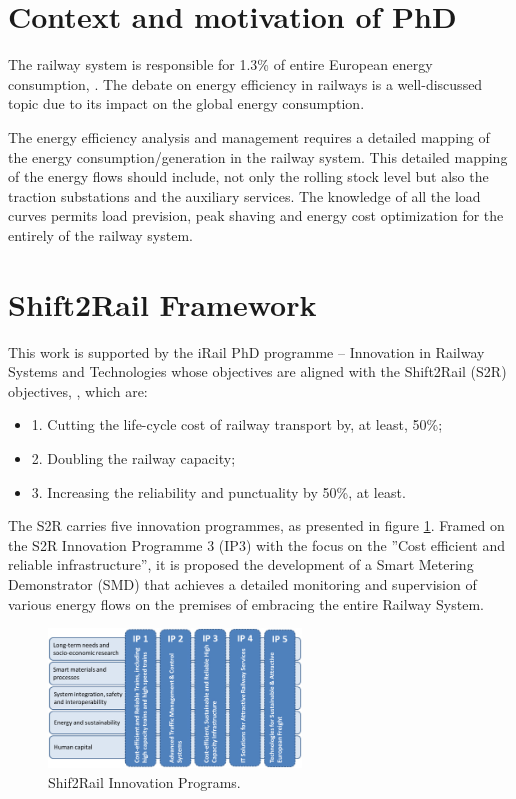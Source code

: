 
\section{Context and motivation of PhD}

The railway system is responsible for 1.3\% of entire European energy consumption, \cite{iea-uic2016}. 
The debate on energy efficiency in railways is a well-discussed topic due to its impact on the global energy consumption.

The energy efficiency analysis and management requires a detailed mapping of the energy consumption/generation in the railway system. 
This detailed mapping of the energy flows should include, not only the rolling stock level but also the traction substations and the auxiliary services.
The knowledge of all the load curves permits load prevision, peak shaving and energy cost optimization for the entirely of the railway system.


\section{Shift2Rail Framework}

This work is supported by the iRail PhD programme – Innovation in Railway Systems and Technologies whose objectives are aligned with the Shift2Rail (S2R) objectives, \cite{shift2rail2015}, which are: 

\begin{itemize}
	\setlength\itemsep{-0.5em}
	\item 1. Cutting the life-cycle cost of railway transport by, at least, 50\%;
	\item 2. Doubling the railway capacity;
	\item 3. Increasing the reliability and punctuality by 50\%, at least.
\end{itemize}


The S2R carries five innovation programmes, as presented in figure \ref{fig:ips}. Framed on the S2R Innovation Programme 3 (IP3) with the focus on the ”Cost efficient and reliable infrastructure”, it is proposed the development of a Smart Metering Demonstrator (SMD) that achieves a detailed monitoring and supervision of various energy flows on the premises of embracing the entire Railway System.

\begin{figure}[h!]
	\centering
	\includegraphics[width=0.60\textwidth,keepaspectratio]{figures/1.Intro/IPs}
	\caption{Shif2Rail Innovation Programs. }
	\label{fig:ips}
\end{figure}

